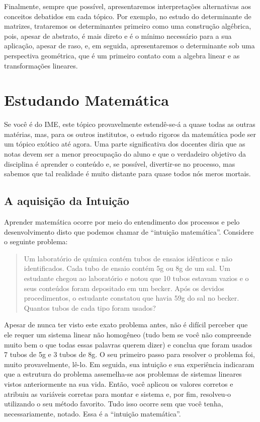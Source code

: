 \documentclass[
  letterpaper,
  DIV=11,
  numbers=noendperiod]{scrreprt}
\begin{document}
Finalmente, sempre que possível, apresentaremos interpretações
alternativas aos conceitos debatidos em cada tópico. Por exemplo, no
estudo do determinante de matrizes, trataremos os determinantes primeiro
como uma construção algébrica, pois, apesar de abstrato, é mais direto e
é o mínimo necessário para a sua aplicação, apesar de raso, e, em
seguida, apresentaremos o determinante sob uma perspectiva geométrica,
que é um primeiro contato com a algebra linear e as transformações
lineares.

\section{Estudando Matemática}\label{estudando-matemuxe1tica}

Se você é do IME, este tópico provavelmente estendê-se-á a quase todas
as outras matérias, mas, para os outros institutos, o estudo rigoros da
matemática pode ser um tópico exótico até agora. Uma parte significativa
dos docentes diria que as notas devem ser a menor preocupação do aluno e
que o verdadeiro objetivo da disciplina é aprender o conteúdo e, se
possível, divertir-se no processo, mas sabemos que tal realidade é muito
distante para quase todos nós meros mortais.

\subsection{A aquisição da
Intuição}\label{a-aquisiuxe7uxe3o-da-intuiuxe7uxe3o}

Aprender matemática ocorre por meio do entendimento dos processos e pelo
desenvolvimento disto que podemos chamar de ``intuição matemática''.
Considere o seguinte problema:

\begin{quote}
Um laboratório de química contém tubos de ensaios idênticos e não
identificados. Cada tubo de ensaio contém 5g ou 8g de um sal. Um
estudante chegou ao laboratório e notou que 10 tubos estavam vazios e o
seus conteúdos foram depositado em um becker. Após os devidos
procedimentos, o estudante constatou que havia 59g do sal no becker.
Quantos tubos de cada tipo foram usados?
\end{quote}

Apesar de nunca ter visto este exato problema antes, não é difícil
perceber que ele requer um sistema linear não homogêneo (tudo bem se
você não compreende muito bem o que todas essas palavras querem dizer) e
conclua que foram usados 7 tubos de 5g e 3 tubos de 8g. O seu primeiro
passo para resolver o problema foi, muito provavelmente, lê-lo. Em
seguida, sua intuição e sua experiência indicaram que a estrutura do
problema assemelha-se aos problemas de sistemas lineares vistos
anteriormente na sua vida. Então, você aplicou os valores corretos e
atribuiu as variáveis corretas para montar e sistema e, por fim,
resolveu-o utilizando o seu método favorito. Tudo isso ocorre sem que
você tenha, necessariamente, notado. Essa é a ``intuição matemática''.
\end{document}
